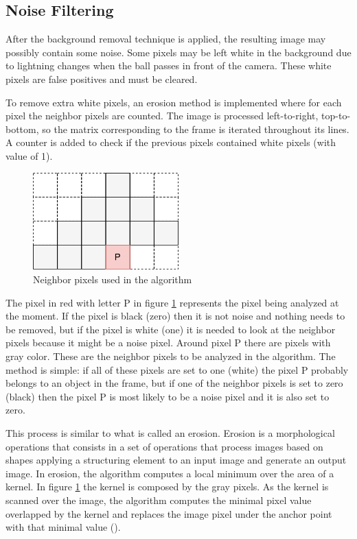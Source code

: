 \subsection{Noise Filtering}

After the background removal technique is applied, the resulting image may possibly contain some noise. Some pixels may be left white in the background due to lightning changes when the ball passes in front of the camera. These white pixels are false positives and must be cleared.

To remove extra white pixels, an erosion method is implemented where for each pixel the neighbor pixels are counted. The image is processed left-to-right, top-to-bottom, so the matrix corresponding to the frame is iterated throughout its lines. A counter is added to check if the previous pixels contained white pixels (with value of 1). 

\begin{figure}[htp]
	
	\centering
	\includegraphics[width=0.5\textwidth]{capcalib/imgs/neighpixel.pdf}
	
	\caption{Neighbor pixels used in the algorithm}
	\label{fig:neigh_cnt}
	
\end{figure}

The pixel in red with letter P in figure \ref{fig:neigh_cnt} represents the pixel being analyzed at the moment. If the pixel is black (zero) then it is not noise and nothing needs to be removed, but if the pixel is white (one) it is needed to look at the neighbor pixels because it might be a noise pixel. Around pixel P there are pixels with gray color. These are the neighbor pixels to be analyzed in the algorithm. The method is simple: if all of these pixels are set to one (white) the pixel P probably belongs to an object in the frame, but if one of the neighbor pixels is set to zero (black) then the pixel P is most likely to be a noise pixel and it is also set to zero.

This process is similar to what is called an erosion. Erosion is a morphological operations that consists in a set of operations that process images based on shapes applying a structuring element to an input image and generate an output image. In erosion, the algorithm computes a local minimum over the area of a kernel. In figure \ref{fig:neigh_cnt} the kernel is composed by the gray pixels. As the kernel is scanned over the image, the algorithm computes the minimal pixel value overlapped by the kernel and replaces the image pixel under the anchor point with that minimal value (\cite{OpenCV2.4.13.6documentation}). 

